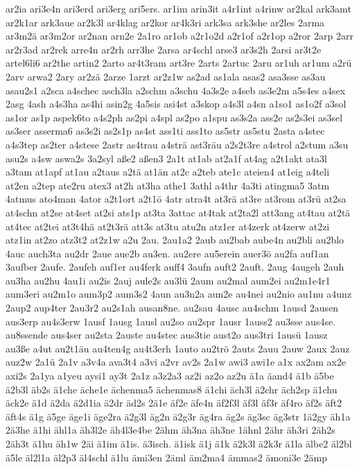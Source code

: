 {ar2ia
ari3e4n
ari3erd
ari3erg
ari5ers.
ar1im
arin3it
a4r1int
a4rinw
ar2kal
ark3amt
ar2k1ar
ark3aue
ar2k3l
ar4klag
ar2kor
ar4k3ri
ark3sa
ark3she
ar2les
2arma
ar3m2ä
ar3m2or
ar2nan
arn2e
2a1ro
ar1ob
a2r1o2d
a2r1of
a2r1op
a2ror
2arp
2arr
ar2r3ad
ar2rek
arre4n
ar2rh
arr3he
2arsa
ar4schl
arse3
ar3s2h
2arsi
ar3t2e
artel6li6
ar2the
artin2
2arto
ar4t3ram
art3re
2arts
2artuc
2aru
ar1uh
ar1um
a2rü
2arv
arwa2
2ary
ar2zä
2arze
1arzt
ar2z1w
as2ad
as1ala
asas2
asa3sse
as3au
asau2s1
a2sca
a4schec
asch3la
a2schm
a3schu
4a3s2e
a4seb
as3e2m
a5s4es
a4sex
2asg
4ash
a4s3ha
as4hi
asin2g
4a5sis
asi4st
a3skop
a4s3l
a4sn
a1so1
as1o2f
a3sol
as1or
as1p
aspek6to
a4s2ph
as2pi
a4spl
as2po
a1spu
as3s2a
ass2e
as2s3ei
as3sel
as3ser
asserma6
as3s2i
as2s1p
as4st
ass1ti
ass1to
as5str
as5stu
2asta
a4stec
a4s3tep
as2ter
a4stese
2astr
as4trau
a4strä
ast3räu
a2s2t3re
a4strol
a2stum
a3su
asu2s
a4sw
aswa2s
3a2syl
aße2
aßen3
2a1t
at1ab
at2a1f
at4ag
a2t1akt
ata3l
a3tam
at1apf
at1au
a2taus
a2tä
at1än
at2c
a2teb
ate1c
ateien4
at1eig
a4teli
at2en
a2tep
ate2ru
atex3
at2h
at3ha
athe1
3athl
a4thr
4a3ti
atingma5
3atm
4atmus
ato4man
4ator
a2t1ort
a2t1ö
4atr
atra4t
at3rä
at3re
at3rom
at3rü
at2sa
at4schn
at2se
at4set
at2si
ats1p
at3ta
3attac
at4tak
at2ta2l
att3ang
at4tau
at2tä
at4tec
at2tei
at3t4hä
at2t3rä
att3s
at3tu
atu2n
atz1er
at4zerk
at4zerw
at2zi
atz1in
at2zo
atz3t2
at2z1w
a2u
2au.
2au1a2
2aub
au2bab
aube4n
au2bli
au2blo
4auc
auch3ta
au2dr
2aue
aue2b
au3en.
au2ere
au5erein
auer3ö
au2fa
auf1an
3aufber
2aufe.
2aufeh
auf1er
au4ferk
auff4
3aufn
auft2
2auft.
2aug
4augeh
2auh
au3ha
au2hu
4au1i
au2is
2auj
aule2s
au3lü
2aum
au2mal
aum2ei
au2m1e4r1
aum3eri
au2m1o
aum3p2
aum3s2
4aun
au3n2a
aun2e
au4nei
au2nio
au1nu
a4unz
2aup2
aup4ter
2au3r2
au2s1ah
ausan8ne.
au2sau
4ausc
au4schm
1ausd
2ausen
aus3erp
au4s3erw
1ausf
1ausg
1ausl
au2so
au2spr
1ausr
1auss2
au3sse
aus4se.
au8ssende
aus4ser
au2sta
2auste
au4stec
aus3tie
aust2o
aus3tri
1ausü
1ausz
au3ße
a4ut
au2t1äu
au4ten4g
au4t3erh
1auto
au2trö
2auts
2auu
2auw
2aux
2auz
auz2w
2a1ü
2a1v
a3v4a
ava3t4
a3vi
a2vr
av2s
2a1w
awi3
awi1e
a1x
ax2am
ax2e
axi2s
2a1ya
a1yeu
aysi1
ay3t
2a1z
a3z2a3
az2i
az2o
az2u
ä1a
äand4
ä1b
ä5be
ä2b3l
äb2s
ä1che
äche1e
ächenma5
ächenmas8
ä1chi
äch3l
ä2chr
äch2sp
ä1chu
äck2e
ä1d
ä2da
ä2d1ia
ä2dr
äd2s
2ä1e
äf2e
äfe4n
äf2f3l
äf3l
äf3r
äf4ro
äf2s
äft2
äft4s
ä1g
ä5ge
äge1i
äge2ra
ä2g3l
äg2n
ä2g3r
äg4ra
äg2s
äg3sc
äg3str
1ä2gy
äh1a
2ä3he
ä1hi
ähl1a
äh3l2e
äh4l3e4be
2ähm
äh3na
äh3ne
1ähnl
2ähr
äh3ri
2äh2s
2äh3t
ä1hu
äh1w
2äi
ä1im
ä1is.
ä3isch.
ä1isk
ä1j
ä1k
ä2k3l
ä2k3r
ä1la
älbe2
äl2bl
ä5le
äl2l1a
äl2p3
äl4schl
ä1lu
ämi3en
2äml
äm2ma4
ämmas2
ämoni3e
2ämp
}

